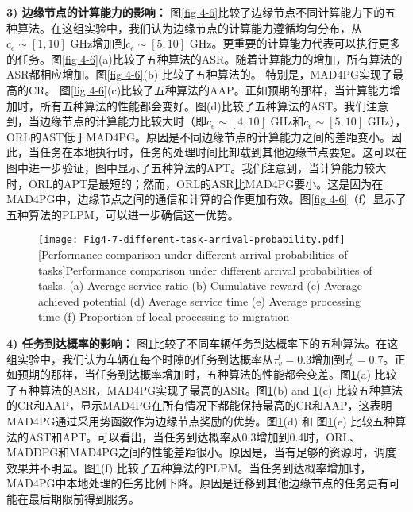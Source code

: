 \textbf{3) 边缘节点的计算能力的影响：} 图\ref{fig 4-6}比较了边缘节点不同计算能力下的五种算法。在这组实验中，我们认为边缘节点的计算能力遵循均匀分布，从$c_e\sim[1, 10]$ GHz增加到$c_e\sim[5, 10]$ GHz。更重要的计算能力代表可以执行更多的任务。图\ref{fig 4-6}(a)比较了五种算法的ASR。随着计算能力的增加，所有算法的ASR都相应增加。图\ref{fig 4-6}(b) 比较了五种算法的。 特别是，MAD4PG实现了最高的CR。 图\ref{fig 4-6}(c)比较了五种算法的AAP。正如预期的那样，当计算能力增加时，所有五种算法的性能都会变好。图(d)比较了五种算法的AST。我们注意到，当边缘节点的计算能力比较大时（即$c_e\sim[4,10]$ GHz和$c_e\sim[5,10]$ GHz），ORL的AST低于MAD4PG。原因是不同边缘节点的计算能力之间的差距变小。因此，当任务在本地执行时，任务的处理时间比卸载到其他边缘节点要短。这可以在图中进一步验证，图中显示了五种算法的APT。我们注意到，当计算能力较大时，ORL的APT是最短的；然而，ORL的ASR比MAD4PG要小。这是因为在MAD4PG中，边缘节点之间的通信和计算的合作更加有效。图\ref{fig 4-6}（f）显示了五种算法的PLPM，可以进一步确信这一优势。


\begin{figure}[h]
\centering
  \texttt{[image: Fig4-7-different-task-arrival-probability.pdf]}
  [Performance comparison under different arrival probabilities of tasks]{Performance comparison under different arrival probabilities of tasks. (a) Average service ratio (b) Cumulative reward (c) Average achieved potential (d) Average service time (e) Average processing time (f) Proportion of local processing to migration}
  \label{fig 4-7}
\end{figure} 

\textbf{4) 任务到达概率的影响：} 图\ref{fig 4-7}比较了不同车辆任务到达概率下的五种算法。在这组实验中，我们认为车辆在每个时隙的任务到达概率从$\tau_{v}^{t}=0.3$增加到$\tau_{v}^{t}=0.7$。正如预期的那样，当任务到达概率增加时，五种算法的性能都会变差。图\ref{fig 4-7}(a) 比较了五种算法的ASR，MAD4PG实现了最高的ASR。图\ref{fig 4-7}(b) and \ref{fig 4-7}(c) 比较五种算法的CR和AAP，显示MAD4PG在所有情况下都能保持最高的CR和AAP，这表明MAD4PG通过采用势函数作为边缘节点奖励的优势。图\ref{fig 4-7}(d) 和 图\ref{fig 4-7}(e) 比较五种算法的AST和APT。可以看出，当任务到达概率从0.3增加到0.4时，ORL、MADDPG和MAD4PG之间的性能差距很小。原因是，当有足够的资源时，调度效果并不明显。图\ref{fig 4-7}(f) 比较了五种算法的PLPM。当任务到达概率增加时，MAD4PG中本地处理的任务比例下降。原因是迁移到其他边缘节点的任务更有可能在最后期限前得到服务。

